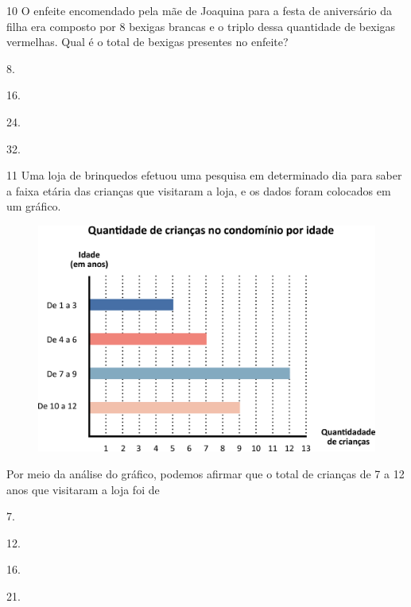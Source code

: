 \num{10} O enfeite encomendado pela mãe de Joaquina para a festa de aniversário da filha era composto por 8 bexigas brancas e o triplo dessa quantidade de bexigas vermelhas. Qual é o total de bexigas presentes no enfeite?

\begin{multicols}{2}
\begin{escolha}
\item
  8.
\item
  16.
\item
  24.
\item
  32.
\end{escolha}
\end{multicols}

\num{11} Uma loja de brinquedos efetuou uma pesquisa em determinado dia para saber a faixa etária das crianças que visitaram a loja, e os dados foram
colocados em um gráfico.

\begin{figure}[htpb!]
\centering
\includegraphics[width=\textwidth]{./media/image118.png}
\end{figure}

Por meio da análise do gráfico, podemos afirmar que o total de crianças de 7 a 12 anos que visitaram a loja foi de

\begin{multicols}{2}
\begin{escolha}
\item
  7.
\item
  12.
\item
  16.
\item
  21.
\end{escolha}
\end{multicols}

